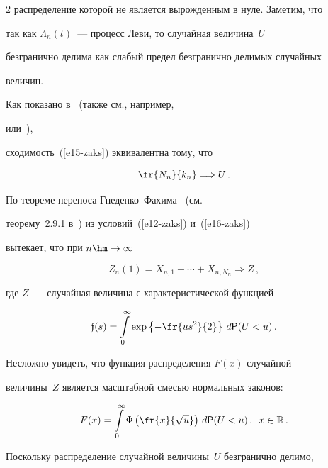 \begin{multicols}{2}
распределение которой не является вы\-рож\-ден\-ным в нуле. Заметим, что

так как $\Lambda_n(t)$~--- процесс Леви, то случайная величина~$U$

безгранично делима как слабый предел безгранично делимых случайных

величин.



Как показано в~\cite{GnedenkoKorolev1996} (также см., например,~\cite{BeningKorolev2002}

или~\cite{KorolevBeningShorgin2011}),

сходимость~(\ref{e15-zaks}) эквивалентна тому, что

\begin{equation}

\fr{N_n}{k_n}\Longrightarrow U\,.\label{e16-zaks}

\end{equation}

По теореме переноса Гне\-ден\-ко--Фа\-хи\-ма~\cite{GnedenkoFahim1969} (см.\

теорему~2.9.1 в~\cite{KorolevBeningShorgin2011}) из условий~(\ref{e12-zaks}) и~(\ref{e16-zaks})

вытекает, что при $n\hm\to\infty$



\noindent

\begin{equation}

Z_n(1)=X_{n,1}+\cdots +X_{n,N_n}\Longrightarrow Z\,,\label{e17-zaks}

\end{equation}

где $Z$~--- случайная величина с характеристической функцией

$$

\mathfrak{f}(s)=\int\limits_{0}^{\infty}\exp\left\{-\fr{us^2}{2}\right\}\,d{\sf P}(U<u)\,.

$$

Несложно увидеть, что функция распределения $F(x)$ случайной

величины~$Z$ является масштабной смесью нормальных законов:

$$

F(x)=\int\limits_{0}^{\infty}\Phi\left(\fr{x}{\sqrt{u}}\right)\,d{\sf P}(U<u)\,,\enskip

x\in\mathbb{R}\,.

$$



Поскольку распределение случайной величины~$U$ безгранично делимо,


\end{multicols}
